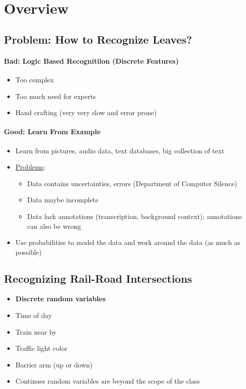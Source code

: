 \section{Overview}

  \subsection{Problem: How to Recognize Leaves?}

    \paragraph{Bad: Logic Based Recognitiion (Discrete Features)}
    \begin{itemize}
      \item Too complex
      \item Too much need for experts
      \item Hand crafting (very very slow and error prone)
    \end{itemize}

    \paragraph{Good: Learn From Example}
    \begin{itemize}
      \item Learn from pictures, audio data, text databases, big collection of text
      \item \ul{Problems}:
      \begin{itemize}
        \item Data contains uncertainties, errors (Department of Computer Silence)
        \item Data maybe incomplete
        \item Data lack annotations (transcription, background context); annotations can also be wrong
      \end{itemize}

      \item Use probabilities to model the data and work around the data (as much as possible)
    \end{itemize}

  \subsection{Recognizing Rail-Road Intersections}

    \begin{itemize}
      \item \textbf{Discrete random variables}
      \item Time of day
      \item Train near by
      \item Traffic light color
      \item Barrier arm (up or down)
      \item Continues random variables are beyond the scope of the class
    \end{itemize}


